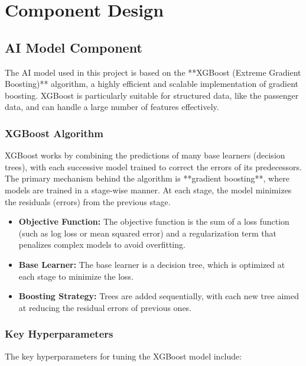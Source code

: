 \documentclass[15pt]{article}
\begin{document}
\section{Component Design}

\subsection{AI Model Component}

The AI model used in this project is based on the **XGBoost (Extreme Gradient Boosting)** algorithm, a highly efficient and scalable implementation of gradient boosting. XGBoost is particularly suitable for structured data, like the passenger data, and can handle a large number of features effectively.

\subsubsection{XGBoost Algorithm}

XGBoost works by combining the predictions of many base learners (decision trees), with each successive model trained to correct the errors of its predecessors. The primary mechanism behind the algorithm is **gradient boosting**, where models are trained in a stage-wise manner. At each stage, the model minimizes the residuals (errors) from the previous stage.

\begin{itemize}
    \item \textbf{Objective Function:} The objective function is the sum of a loss function (such as log loss or mean squared error) and a regularization term that penalizes complex models to avoid overfitting.
    \item \textbf{Base Learner:} The base learner is a decision tree, which is optimized at each stage to minimize the loss.
    \item \textbf{Boosting Strategy:} Trees are added sequentially, with each new tree aimed at reducing the residual errors of previous ones.
\end{itemize}

\subsubsection{Key Hyperparameters}

The key hyperparameters for tuning the XGBoost model include:
\end{document}
